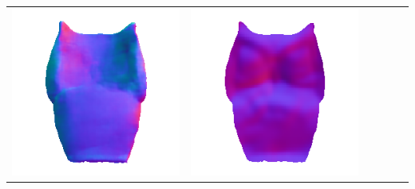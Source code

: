 \begin{center}
\begin{tabularx}{\linewidth}{@{}Y@{}Y@{}Y@{}Y@{}Y@{}Y@{}}
\includegraphics[width=\linewidth]{semisynthetic/20160617_15_marrnet_out.png} &
\includegraphics[width=\linewidth]{semisynthetic/20160617_15_ef_out.png} \\

\end{tabularx}
\end{center}
